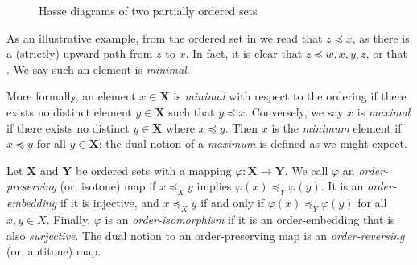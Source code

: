 \begin{figure}[H]
  \centering
  \small
  \begin{subfigure}{0.3\textwidth}
    \centering
    \label{subfigure:partial-order-a}
  \end{subfigure}%
  \begin{subfigure}{0.3\textwidth}
    \centering
    \label{subfigure:partial-order-b}
  \end{subfigure}%
  \caption{Hasse diagrams of two partially ordered sets}
  \label{figure:hasse-diagram}
\end{figure}

As an illustrative example, from the ordered set in  we read that $z \preceq x$, as there is a (strictly) upward path from $z$ to $x$. In fact, it is clear that $z \preceq w, x,y,z$, or that . We say such an element is \textit{minimal}.

More formally, an element $x \in \mathbf{X}$ is \textit{minimal} with respect to the ordering if there exists no distinct element $y \in \mathbf{X}$ such that $y \preceq x$. Conversely, we say $x$ is \textit{maximal} if there exists no distinct $y \in \mathbf{X}$ where $x \preceq y$. Then $x$ is the \textit{minimum} element if $x \preceq y$ for all $y \in \mathbf{X}$; the dual notion of a \textit{maximum} is defined as we might expect.    

\begin{definition}
  \label{definition:order-maps}
    
  Let $\mathbf{X}$ and $\mathbf{Y}$ be ordered sets with a mapping $\varphi : \mathbf{X} \to \mathbf{Y}$. We call $\varphi$ an \textit{order-preserving} (or, isotone) map if $x \preceq_X y$ implies $\varphi(x) \preceq_Y \varphi(y)$. It is an \textit{order-embedding} if it is injective, and $x \preceq_X y$ if and only if $\varphi(x) \preceq_Y \varphi(y)$ for all $x,y \in X$. Finally, $\varphi$ is an \textit{order-isomorphism} if it is an order-embedding that is also \textit{surjective}. The dual notion to an order-preserving map is an \textit{order-reversing} (or, antitone) map. 
\end{definition}

